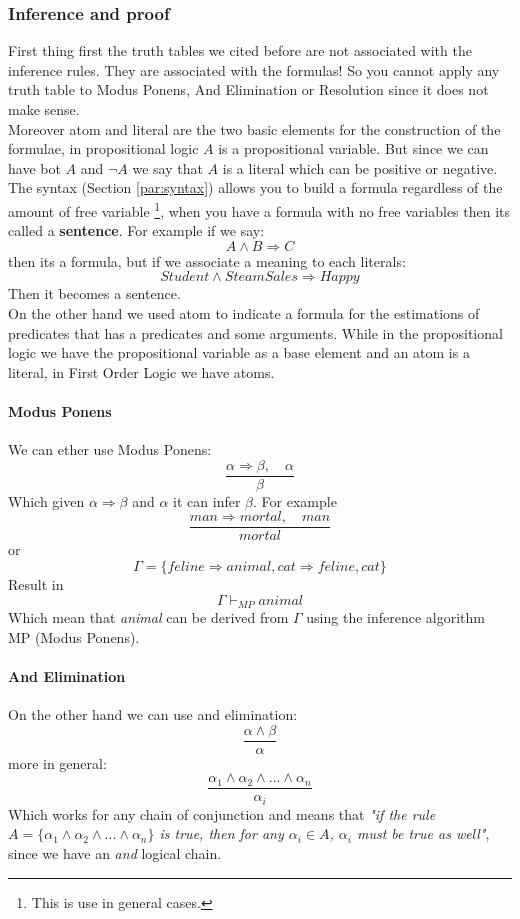 \documentclass[10pt,a4paper]{article}
\begin{document}
\subsubsection{Inference and proof}
\label{subsec:modusPonens}

First thing first the truth tables we cited before are not associated with the inference rules. They are associated with the formulas! So you cannot apply any truth table to Modus Ponens, And Elimination or Resolution since it does not make sense.\\

Moreover atom and literal are the two basic elements for the construction of the formulae, in propositional logic $A$ is a propositional variable. But since we can have bot $A$ and $\neg A$ we say that $A$ is a literal which can be positive or negative.\\

The syntax (Section \ref{par:syntax}) allows you to build a formula regardless of the amount of free variable \footnote{This is use in general cases.}, when you have a formula with no free variables then its called a \textbf{sentence}. For example if we say:
\[A\wedge B \Rightarrow C\]
then its a formula, but if we associate a meaning to each literals:
\[Student \wedge SteamSales \Rightarrow Happy\]
Then it becomes a sentence.\\

On the other hand we used atom to indicate a formula for the estimations of predicates that has a predicates and some arguments. While in the propositional logic we have the propositional variable as a base element and an atom is a literal, in First Order Logic we have atoms.


\paragraph{Modus Ponens} We can ether use Modus Ponens:
\[\frac{\alpha \Rightarrow \beta,\quad \alpha}{\beta}\]
Which given $\alpha \Rightarrow \beta$ and $\alpha$ it can infer $\beta$. For example
\[\frac{man \Rightarrow mortal,\quad man}{mortal}\]
or
\[\Gamma =\lbrace feline \Rightarrow animal, cat \Rightarrow feline, cat \rbrace\]
Result in 
\[\Gamma \vdash_{MP} animal\]
Which mean that \textit{animal} can be derived from $\Gamma$ using the inference algorithm MP (Modus Ponens).\\

\paragraph{And Elimination}On the other hand we can use and elimination:
\[\frac{\alpha\wedge\beta}{\alpha}\]
more in general:
\[\frac{\alpha_1\wedge\alpha_2\wedge...\wedge \alpha_n}{\alpha_i}\]
Which works for any chain of conjunction and means that \textit{"if the rule $A=\lbrace\alpha_1\wedge\alpha_2\wedge...\wedge \alpha_n\rbrace$ is true, then for any $\alpha_i \in A$, $\alpha_i$ must be true as well"}, since we have an \textit{and} logical chain.\\
\end{document}
